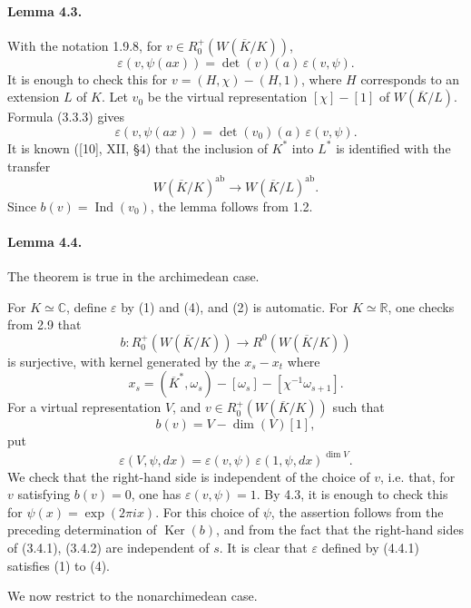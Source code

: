 \documentclass[10pt,letterpaper]{article}
\newcommand{\C}{\mathbb C}
\newcommand{\Ind}{\operatorname{Ind}}
\providecommand{\Ker}{\operatorname{Ker}}
\providecommand{\ab}{\mathrm{ab}}
\providecommand{\R}{\mathbb R}
\providecommand{\ab}{\mathrm{ab}}
\providecommand{\ab}{\mathrm{ab}}
\providecommand{\Ind}{\operatorname{Ind}}
\providecommand{\Ker}{\operatorname{Ker}}
\begin{document}
\paragraph{Lemma 4.3.} With the notation 1.9.8, for \(v\in R^+_0(W(\overline K/K))\),
\[
\varepsilon(v,\psi(ax))=\det(v)(a)\,\varepsilon(v,\psi).
\]
It is enough to check this for \(v=(H,\chi)-(H,1)\), where \(H\) corresponds to an extension \(L\) of \(K\). Let \(v_0\) be the virtual representation \([\chi]-[1]\) of \(W(\overline K/L)\). Formula (3.3.3) gives
\[
\varepsilon(v,\psi(ax))=\det(v_0)(a)\,\varepsilon(v,\psi).
\]
It is known ([10], XII, §4) that the inclusion of \(K^*\) into \(L^*\) is identified with the transfer
\[
W(\overline K/K)^{\ab}\longrightarrow W(\overline K/L)^{\ab}.
\]
Since \(b(v)=\Ind(v_0)\), the lemma follows from 1.2.

\paragraph{Lemma 4.4.} The theorem is true in the archimedean case.

For \(K\simeq\C\), define \(\varepsilon\) by (1) and (4), and (2) is automatic. For \(K\simeq\R\), one checks from 2.9 that
\[
b:R^+_0(W(\overline K/K))\longrightarrow R^0(W(\overline K/K))
\]
is surjective, with kernel generated by the \(x_s-x_t\) where
\[
x_s=(\overline K^*,\omega_s)-[\omega_s]-[\chi^{-1}\omega_{s+1}].
\]
For a virtual representation \(V\), and \(v\in R^+_0(W(\overline K/K))\) such that
\[
b(v)=V-\dim(V)[1],
\]
put
\[
\tag{4.4.1}
\varepsilon(V,\psi,dx)=\varepsilon(v,\psi)\,\varepsilon(1,\psi,dx)^{\dim V}.
\]
We check that the right-hand side is independent of the choice of \(v\), i.e. that, for \(v\) satisfying \(b(v)=0\), one has \(\varepsilon(v,\psi)=1\). By 4.3, it is enough to check this for \(\psi(x)=\exp(2\pi ix)\). For this choice of \(\psi\), the assertion follows from the preceding determination of \(\Ker(b)\), and from the fact that the right-hand sides of (3.4.1), (3.4.2) are independent of \(s\). It is clear that \(\varepsilon\) defined by (4.4.1) satisfies (1) to (4).

We now restrict to the nonarchimedean case.
\end{document}
